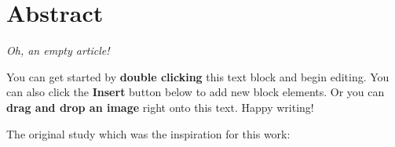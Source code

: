 \section{Abstract}
\textit{Oh, an empty article!} 

You can get started by \textbf{double clicking} this text block and begin editing. You can also click the \textbf{Insert} button below to add new block elements. Or you can \textbf{drag and drop an image} right onto this text. Happy writing!

The original study which was the inspiration for this work:

